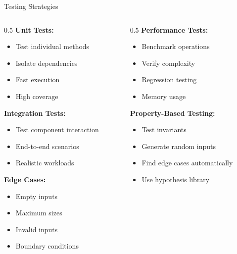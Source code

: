 \documentclass[aspectratio=169,xcolor=dvipsnames]{beamer}
\begin{document}
\begin{frame}{Testing Strategies}
  \begin{columns}
    \begin{column}{0.5\textwidth}
      \textbf{Unit Tests:}
      \begin{itemize}
        \item Test individual methods
        \item Isolate dependencies
        \item Fast execution
        \item High coverage
      \end{itemize}

      \vspace{0.2cm}
      \textbf{Integration Tests:}
      \begin{itemize}
        \item Test component interaction
        \item End-to-end scenarios
        \item Realistic workloads
      \end{itemize}

      \vspace{0.2cm}
      \textbf{Edge Cases:}
      \begin{itemize}
        \item Empty inputs
        \item Maximum sizes
        \item Invalid inputs
        \item Boundary conditions
      \end{itemize}
    \end{column}

    \begin{column}{0.5\textwidth}
      \textbf{Performance Tests:}
      \begin{itemize}
        \item Benchmark operations
        \item Verify complexity
        \item Regression testing
        \item Memory usage
      \end{itemize}

      \vspace{0.2cm}
      \textbf{Property-Based Testing:}
      \begin{itemize}
        \item Test invariants
        \item Generate random inputs
        \item Find edge cases automatically
        \item Use hypothesis library
      \end{itemize}


\end{column}
\end{columns}
\end{frame}
\end{document}
